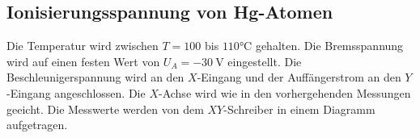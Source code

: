 \subsection{Ionisierungsspannung von Hg-Atomen}
Die Temperatur wird zwischen $T=100$ bis $110\si{\degreeCelsius}$ gehalten.
Die Bremsspannung wird auf einen festen Wert von $U_A = \SI{-30}{\volt}$ eingestellt.
Die Beschleunigerspannung wird an den $X$-Eingang und der Auffängerstrom an den $Y$-Eingang angeschlossen.
Die $X$-Achse wird wie in den vorhergehenden Messungen geeicht.
Die Messwerte werden von dem $XY$-Schreiber in einem Diagramm aufgetragen.
